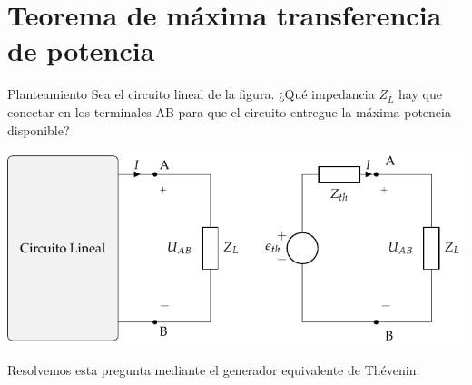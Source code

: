 \documentclass[xcolor={usenames,svgnames,dvipsnames}]{beamer}
\begin{document}
\section{Teorema de máxima transferencia de potencia}
\label{sec:org4461546}

\begin{frame}[label={sec:org5988a01}]{Planteamiento}
Sea el circuito lineal de la figura. ¿Qué impedancia \(Z_L\) hay que conectar en los terminales AB para que el circuito entregue la máxima potencia disponible?

\begin{center}
\includegraphics[width=.9\linewidth]{figs/EquivalenteThevenin.pdf}
\end{center}

Resolvemos esta pregunta mediante el generador equivalente de Thévenin.
\end{frame}
\end{document}
